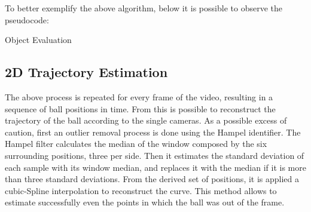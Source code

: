 \documentclass[a4paper]{article}
\begin{document}
To better exemplify the above algorithm, below it is possible to observe the pseudocode:
\begin{algorithm}[H]
\caption{Object Evaluation}
\begin{algorithmic}
 
 
\Else {}
\EndIf
{} 
	\EndIf
\EndIf
\EndFor

\end{algorithmic}
\end{algorithm}

\subsection{2D Trajectory Estimation}
The above process is repeated for every frame of the video, resulting in a sequence of ball positions in time. From this is possible to reconstruct the trajectory of the ball according to the single cameras. 
As a possible excess of caution, first an outlier removal process is done using the Hampel identifier. The Hampel filter calculates the median of the window composed by the six surrounding positions, three per side. Then it estimates the standard deviation of each sample with its window median, and replaces it with the median if it is more than three standard deviations. 
From the derived set of positions, it is applied a cubic-Spline interpolation to reconstruct the curve. This method allows to estimate successfully even the points in which the ball was out of the frame.  
\end{document}
